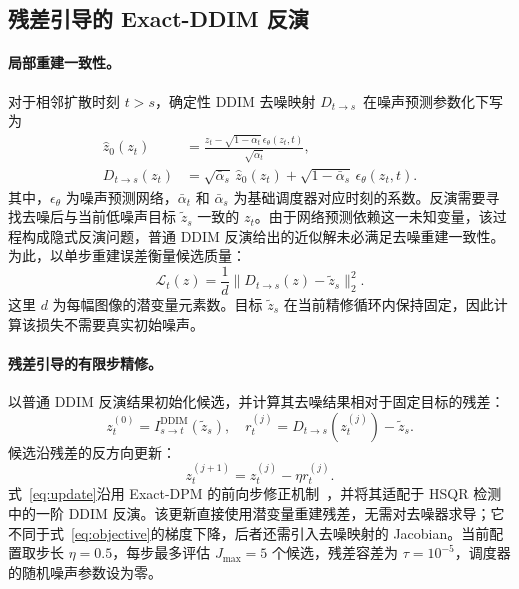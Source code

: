 \documentclass[10pt,twocolumn,letterpaper]{article}
\begin{document}
\subsection{残差引导的 Exact-DDIM 反演}

\paragraph{局部重建一致性。}
对于相邻扩散时刻 $t>s$，确定性 DDIM 去噪映射 $D_{t\to s}$~\cite{ddim2021}在噪声预测参数化下写为
\begin{equation}\begin{aligned}\widehat z_0(z_t)&=\frac{z_t-\sqrt{1-\bar\alpha_t}\,\epsilon_\theta(z_t,t)}{\sqrt{\bar\alpha_t}},\\D_{t\to s}(z_t)&=\sqrt{\bar\alpha_s}\,\widehat z_0(z_t)+\sqrt{1-\bar\alpha_s}\,\epsilon_\theta(z_t,t).\end{aligned}\label{eq:ddim}\end{equation}
其中，$\epsilon_\theta$ 为噪声预测网络，$\bar\alpha_t$ 和 $\bar\alpha_s$ 为基础调度器对应时刻的系数。反演需要寻找去噪后与当前低噪声目标 $\widetilde z_s$ 一致的 $z_t$。由于网络预测依赖这一未知变量，该过程构成隐式反演问题，普通 DDIM 反演给出的近似解未必满足去噪重建一致性。为此，以单步重建误差衡量候选质量：
\begin{equation}\mathcal L_t(z)=\frac1d\|D_{t\to s}(z)-\widetilde z_s\|_2^2.\label{eq:objective}\end{equation}
这里 $d$ 为每幅图像的潜变量元素数。目标 $\widetilde z_s$ 在当前精修循环内保持固定，因此计算该损失不需要真实初始噪声。

\paragraph{残差引导的有限步精修。}
以普通 DDIM 反演结果初始化候选，并计算其去噪结果相对于固定目标的残差：
\begin{equation}z_t^{(0)}=I_{s\to t}^{\mathrm{DDIM}}(\widetilde z_s),\quad r_t^{(j)}=D_{t\to s}(z_t^{(j)})-\widetilde z_s.\label{eq:residual}\end{equation}
候选沿残差的反方向更新：
\begin{equation}z_t^{(j+1)}=z_t^{(j)}-\eta r_t^{(j)}.\label{eq:update}\end{equation}
式~\eqref{eq:update}沿用 Exact-DPM 的前向步修正机制~\cite{exactdpm2024}，并将其适配于 HSQR 检测中的一阶 DDIM 反演。该更新直接使用潜变量重建残差，无需对去噪器求导；它不同于式~\eqref{eq:objective}的梯度下降，后者还需引入去噪映射的 Jacobian。当前配置取步长 $\eta=0.5$，每步最多评估 $J_{\max}=5$ 个候选，残差容差为 $\tau=10^{-5}$，调度器的随机噪声参数设为零。
\end{document}
